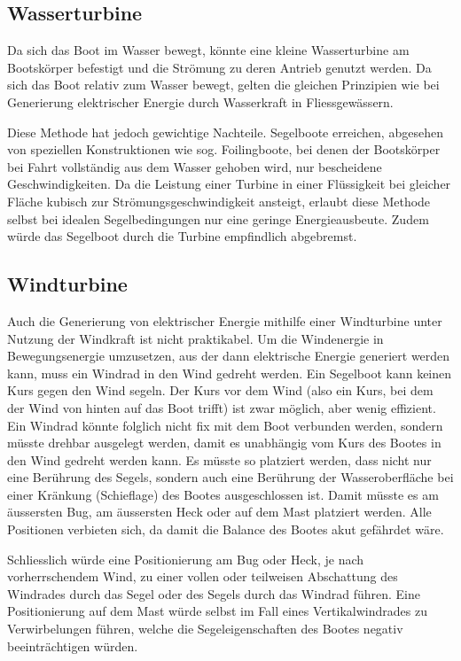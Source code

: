 \subsection{Wasserturbine}
Da sich das Boot im Wasser bewegt, könnte eine kleine Wasserturbine am Bootskörper befestigt und die Strömung zu deren Antrieb genutzt werden. Da sich das Boot relativ zum Wasser bewegt, gelten die gleichen Prinzipien wie bei Generierung elektrischer Energie durch Wasserkraft in Fliessgewässern.

Diese Methode hat jedoch gewichtige Nachteile. Segelboote erreichen, abgesehen von speziellen Konstruktionen wie sog. Foilingboote, bei denen der Bootskörper bei Fahrt vollständig aus dem Wasser gehoben wird, nur bescheidene Geschwindigkeiten. Da die Leistung einer Turbine in einer Flüssigkeit bei gleicher Fläche kubisch zur Strömungsgeschwindigkeit ansteigt, erlaubt diese Methode selbst bei idealen Segelbedingungen nur eine geringe Energieausbeute. Zudem würde das Segelboot durch die Turbine empfindlich abgebremst. 

\subsection{Windturbine}
Auch die Generierung von elektrischer Energie mithilfe einer Windturbine unter Nutzung der Windkraft ist nicht praktikabel. Um die Windenergie in Bewegungsenergie umzusetzen, aus der dann elektrische Energie generiert werden kann, muss ein Windrad in den Wind gedreht werden. Ein Segelboot kann keinen Kurs gegen den Wind segeln. Der Kurs vor dem Wind (also ein Kurs, bei dem der Wind von hinten auf das Boot trifft) ist zwar möglich, aber wenig effizient. Ein Windrad könnte folglich nicht fix mit dem Boot verbunden werden, sondern müsste drehbar ausgelegt werden, damit es unabhängig vom Kurs des Bootes in den Wind gedreht werden kann. Es müsste so platziert werden, dass nicht nur eine Berührung des Segels, sondern auch eine Berührung der Wasseroberfläche bei einer Kränkung (Schieflage) des Bootes ausgeschlossen ist. Damit müsste es am äussersten Bug, am äussersten Heck oder auf dem Mast platziert werden. Alle Positionen verbieten sich, da damit die Balance des Bootes akut gefährdet wäre. 

Schliesslich würde eine Positionierung am Bug oder Heck, je nach vorherrschendem Wind, zu einer vollen oder teilweisen Abschattung des Windrades durch das Segel oder des Segels durch das Windrad führen. Eine Positionierung auf dem Mast würde selbst im Fall eines Vertikalwindrades zu Verwirbelungen führen, welche die Segeleigenschaften des Bootes negativ beeinträchtigen würden. 

